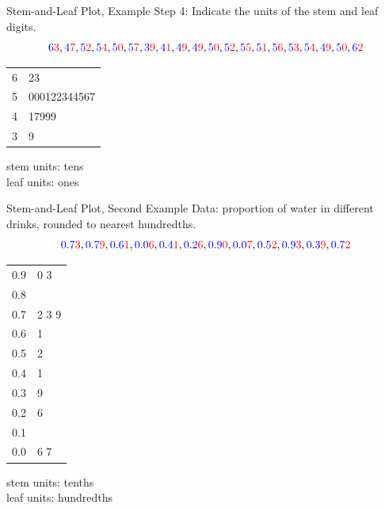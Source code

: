 \documentclass{beamer}
\newcommand{\blue}[1]{{\color{blue} #1}}
\newcommand{\red}[1]{{\color{red} #1}}
\newcommand{\bluRed}[2]{{\color{blue} #1}{\color{red} #2}}
\begin{document}
\begin{frame}{Stem-and-Leaf Plot, Example}
    Step 4: Indicate the units of the \red{stem} and \blue{leaf} digits.
    \[\bluRed{6}{3},
        \bluRed{4}{7},
        \bluRed{5}{2},
        \bluRed{5}{4},
        \bluRed{5}{0},
        \bluRed{5}{7},
        \bluRed{3}{9},
        \bluRed{4}{1},
        \bluRed{4}{9},
        \bluRed{4}{9},
        \bluRed{5}{0},
        \bluRed{5}{2},
        \bluRed{5}{5},
        \bluRed{5}{1},
        \bluRed{5}{6},
        \bluRed{5}{3},
        \bluRed{5}{4},
        \bluRed{4}{9},
        \bluRed{5}{0},
        \bluRed{6}{2}\]
    \begin{table}
        \begin{tabular}{r | l}
            \blue{6} & \red{23}           \\
            \blue{5} & \red{000122344567} \\
            \blue{4} & \red{17999}        \\
            \blue{3} & \red{9}            \\
        \end{tabular}
    \end{table}
    \blue{stem units: tens}\\
    \red{leaf units: ones}
\end{frame}

\begin{frame}{Stem-and-Leaf Plot, Second Example}
    Data: proportion of water in different drinks, rounded to nearest hundredths.
    \[\bluRed{0.7}{3},
        \bluRed{0.7}{9},
        \bluRed{0.6}{1},
        \bluRed{0.0}{6},
        \bluRed{0.4}{1},
        \bluRed{0.2}{6},
        \bluRed{0.9}{0},
        \bluRed{0.0}{7},
        \bluRed{0.5}{2},
        \bluRed{0.9}{3},
        \bluRed{0.3}{9},
        \bluRed{0.7}{2}\]
    \begin{table}
        \begin{tabular}{r | l}
            \blue{0.9} & \red{0 3}   \\
            \blue{0.8} & \red{}      \\
            \blue{0.7} & \red{2 3 9} \\
            \blue{0.6} & \red{1}     \\
            \blue{0.5} & \red{2}     \\
            \blue{0.4} & \red{1}     \\
            \blue{0.3} & \red{9}     \\
            \blue{0.2} & \red{6}     \\
            \blue{0.1} & \red{}      \\
            \blue{0.0} & \red{6 7}   \\
        \end{tabular}
    \end{table}
    \blue{stem units: tenths}\\
    \red{leaf units: hundredths}
\end{frame}
\end{document}
